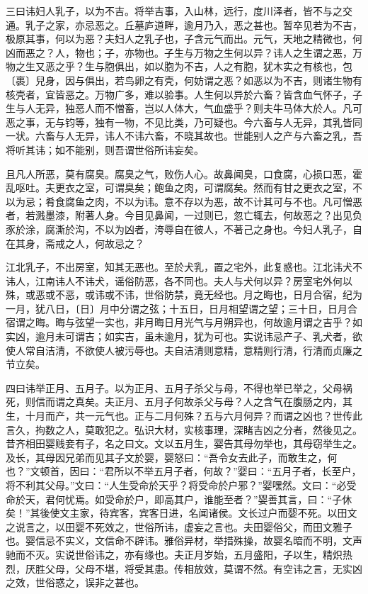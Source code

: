 \documentclass[]{article}
\begin{document}
三曰讳妇人乳子，以为不吉。将举吉事，入山林，远行，度川泽者，皆不与之交通。乳子之家，亦忌恶之。丘墓庐道畔，逾月乃入，恶之甚也。暂卒见若为不吉，极原其事，何以为恶？夫妇人之乳子也，子含元气而出。元气，天地之精微也，何凶而恶之？人，物也；子，亦物也。子生与万物之生何以异？讳人之生谓之恶，万物之生又恶之乎？生与胞俱出，如以胞为不吉，人之有胞，犹木实之有核也，包〔裹〕兒身，因与俱出，若鸟卵之有壳，何妨谓之恶？如恶以为不吉，则诸生物有核壳者，宜皆恶之。万物广多，难以验事。人生何以异於六畜？皆含血气怀子，子生与人无异，独恶人而不憎畜，岂以人体大，气血盛乎？则夫牛马体大於人。凡可恶之事，无与钧等，独有一物，不见比类，乃可疑也。今六畜与人无异，其乳皆同一状。六畜与人无异，讳人不讳六畜，不晓其故也。世能别人之产与六畜之乳，吾将听其讳；如不能别，则吾谓世俗所讳妄矣。

且凡人所恶，莫有腐臭。腐臭之气，败伤人心。故鼻闻臭，口食腐，心损口恶，霍乱呕吐。夫更衣之室，可谓臭矣；鲍鱼之肉，可谓腐矣。然而有甘之更衣之室，不以为忌；肴食腐鱼之肉，不以为讳。意不存以为恶，故不计其可与不也。凡可憎恶者，若溅墨漆，附著人身。今目见鼻闻，一过则已，忽亡辄去，何故恶之？出见负豕於涂，腐澌於沟，不以为凶者，洿辱自在彼人，不著己之身也。今妇人乳子，自在其身，斋戒之人，何故忌之？

江北乳子，不出房室，知其无恶也。至於犬乳，置之宅外，此复惑也。江北讳犬不讳人，江南讳人不讳犬，谣俗防恶，各不同也。夫人与犬何以异？房室宅外何以殊，或恶或不恶，或讳或不讳，世俗防禁，竟无经也。月之晦也，日月合宿，纪为一月，犹八日，〔日〕月中分谓之弦；十五日，日月相望谓之望；三十日，日月合宿谓之晦。晦与弦望一实也，非月晦日月光气与月朔异也，何故逾月谓之吉乎？如实凶，逾月未可谓吉；如实吉，虽未逾月，犹为可也。实说讳忌产子、乳犬者，欲使人常自洁清，不欲使人被污辱也。夫自洁清则意精，意精则行清，行清而贞廉之节立矣。

四曰讳举正月、五月子。以为正月、五月子杀父与母，不得也举已举之，父母祸死，则信而谓之真矣。夫正月、五月子何故杀父与母？人之含气在腹肠之内，其生，十月而产，共一元气也。正与二月何殊？五与六月何异？而谓之凶也？世传此言久，拘数之人，莫敢犯之。弘识大材，实核事理，深睹吉凶之分者，然後见之。昔齐相田婴贱妾有子，名之曰文。文以五月生，婴告其母勿举也，其母窃举生之。及长，其母因兄弟而见其子文於婴，婴怒曰：``吾令女去此子，而敢生之，何也？''文顿首，因曰：``君所以不举五月子者，何故？''婴曰：``五月子者，长至户，将不利其父母。''文曰：``人生受命於天乎？将受命於户邪？''婴嘿然。文曰：``必受命於天，君何忧焉。如受命於户，即高其户，谁能至者？''婴善其言，曰：``子休矣！''其後使文主家，待宾客，宾客日进，名闻诸侯。文长过户而婴不死。以田文之说言之，以田婴不死效之，世俗所讳，虚妄之言也。夫田婴俗父，而田文雅子也。婴信忌不实义，文信命不辟讳。雅俗异材，举措殊操，故婴名暗而不明，文声驰而不灭。实说世俗讳之，亦有缘也。夫正月岁始，五月盛阳，子以生，精炽热烈，厌胜父母，父母不堪，将受其患。传相放效，莫谓不然。有空讳之言，无实凶之效，世俗惑之，误非之甚也。
\end{document}
